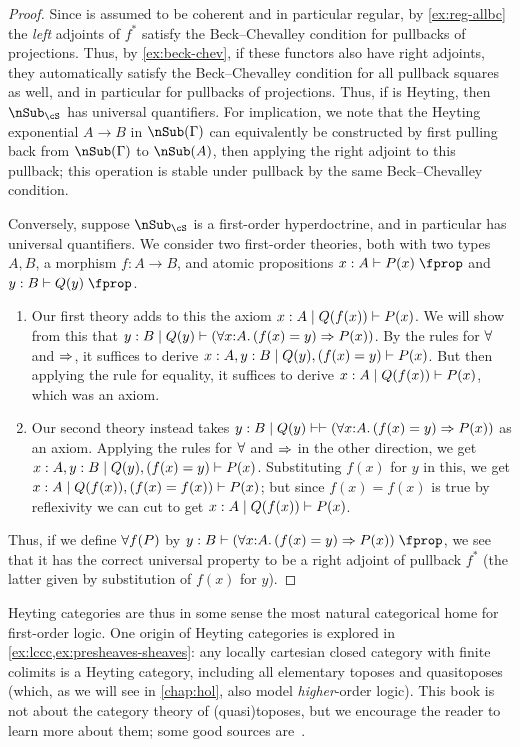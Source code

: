 \begin{proof}
  Since \cS is assumed to be coherent and in particular regular, by \cref{ex:reg-allbc} the \emph{left} adjoints of $f^*$ satisfy the Beck--Chevalley condition for pullbacks of projections.
  Thus, by \cref{ex:beck-chev}, if these functors also have right adjoints, they automatically satisfy the Beck--Chevalley condition for all pullback squares as well, and in particular for pullbacks of projections.
  Thus, if \cS is Heyting, then $\sub_\cS$ has universal quantifiers.
  For implication, we note that the Heyting exponential $A\to B$ in $\sub(\Gamma)$ can equivalently be constructed by first pulling back from $\sub(\Gamma)$ to $\sub(A)$, then applying the right adjoint to this pullback; this operation is stable under pullback by the same Beck--Chevalley condition.

  Conversely, suppose $\sub_\cS$ is a first-order hyperdoctrine, and in particular has universal quantifiers.
  We consider two first-order theories, both with two types $A,B$, a morphism $f:A\to B$, and atomic propositions $x:A \types P(x)\prop$ and $y:B \types Q(y)\prop$.
  \begin{enumerate}
  \item Our first theory adds to this the axiom $x:A \mid Q(f(x))\vdash P(x)$.
    We will show from this that $y:B \cb Q(y) \types (\forall x:A. (f(x)=y) \To P(x))$.
    By the rules for $\all$ and $\Rightarrow$, it suffices to derive $x:A,y:B \mid Q(y), (f(x)=y)\vdash P(x)$.
    But then applying the rule for equality, it suffices to derive $x:A \mid Q(f(x)) \vdash P(x)$, which was an axiom.
  \item Our second theory instead takes $y:B \cb Q(y) \types \types (\forall x:A. (f(x)=y) \To P(x))$ as an axiom.
    Applying the rules for $\all$ and $\Rightarrow$ in the other direction, we get $x:A,y:B \mid Q(y), (f(x)=y) \vdash P(x)$.
    Substituting $f(x)$ for $y$ in this, we get $x:A\mid Q(f(x)), (f(x)=f(x)) \vdash P(x)$; but since $f(x)=f(x)$ is true by reflexivity we can cut to get $x:A \mid Q(f(x))\vdash P(x)$.
  \end{enumerate}
  Thus, if we define $\all f(P)$ by $y:B \types (\forall x:A. (f(x)=y) \To P(x))\prop$, we see that it has the correct universal property to be a right adjoint of pullback $f^*$ (the latter given by substitution of $f(x)$ for $y$).
\end{proof}

Heyting categories are thus in some sense the most natural categorical home for first-order logic.
One origin of Heyting categories is explored in \cref{ex:lccc,ex:presheaves-sheaves}: any locally cartesian closed category with finite colimits is a Heyting category, including all elementary toposes and quasitoposes (which, as we will see in \cref{chap:hol}, also model \emph{higher}-order logic).
This book is not about the category theory of (quasi)toposes, but we encourage the reader to learn more about them; some good sources are~\cite{mm:shv-gl,mclarty:ecat-etop,ptj:elephant,wyler:quasitopoi}.


